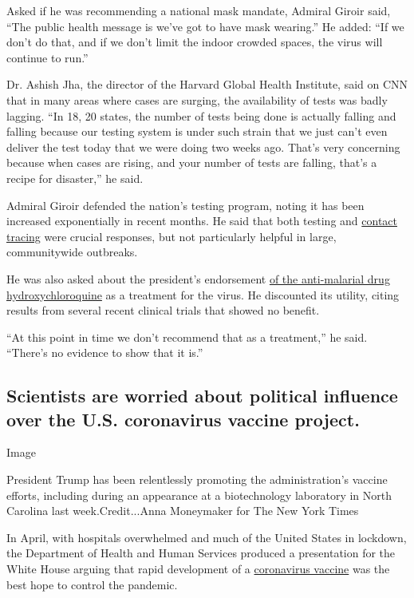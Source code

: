 Asked if he was recommending a national mask mandate, Admiral Giroir
said, ``The public health message is we've got to have mask wearing.''
He added: ``If we don't do that, and if we don't limit the indoor
crowded spaces, the virus will continue to run.''

Dr. Ashish Jha, the director of the Harvard Global Health Institute,
said on CNN that in many areas where cases are surging, the availability
of tests was badly lagging. ``In 18, 20 states, the number of tests
being done is actually falling and falling because our testing system is
under such strain that we just can't even deliver the test today that we
were doing two weeks ago. That's very concerning because when cases are
rising, and your number of tests are falling, that's a recipe for
disaster,'' he said.

Admiral Giroir defended the nation's testing program, noting it has been
increased exponentially in recent months. He said that both testing and
\href{https://www.nytimes.com/2020/07/31/health/covid-contact-tracing-tests.html}{contact
tracing} were crucial responses, but not particularly helpful in large,
communitywide outbreaks.

He was also asked about the president's endorsement
\href{https://www.nytimes.com/2020/07/28/technology/virus-video-trump.html}{of
the anti-malarial drug hydroxychloroquine} as a treatment for the virus.
He discounted its utility, citing results from several recent clinical
trials that showed no benefit.

``At this point in time we don't recommend that as a treatment,'' he
said. ``There's no evidence to show that it is.''

\hypertarget{scientists-are-worried-about-political-influence-over-the-us-coronavirus-vaccine-project}{%
\subsection{Scientists are worried about political influence over the
U.S. coronavirus vaccine
project.}\label{scientists-are-worried-about-political-influence-over-the-us-coronavirus-vaccine-project}}

Image

President Trump has been relentlessly promoting the administration's
vaccine efforts, including during an appearance at a biotechnology
laboratory in North Carolina last week.Credit...Anna Moneymaker for The
New York Times

In April, with hospitals overwhelmed and much of the United States in
lockdown, the Department of Health and Human Services produced a
presentation for the White House arguing that rapid development of a
\href{https://www.nytimes.com/interactive/2020/science/coronavirus-vaccine-tracker.html}{coronavirus
vaccine} was the best hope to control the pandemic.

